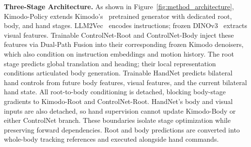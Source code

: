
\textbf{Three-Stage Architecture.}
As shown in Figure~\ref{fig:method_architecture}, Kimodo-Policy extends Kimodo's~\cite{kimodo} pretrained generator with dedicated root, body, and hand stages. LLM2Vec~\cite{behnamghader2024llm2veclargelanguagemodels} encodes instructions; frozen DINOv3~\cite{dinov3} extracts visual features. Trainable ControlNet-Root and ControlNet-Body inject these features via Dual-Path Fusion into their corresponding frozen Kimodo denoisers, which also condition on instruction embeddings and motion history. The root stage predicts global translation and heading; their local representation conditions articulated body generation. Trainable HandNet predicts bilateral hand controls from future body features, visual features, and the current bilateral hand state. All root-to-body conditioning is detached, blocking body-stage gradients to Kimodo-Root and ControlNet-Root. HandNet's body and visual inputs are also detached, so hand supervision cannot update Kimodo-Body or either ControlNet branch. These boundaries isolate stage optimization while preserving forward dependencies. Root and body predictions are converted into whole-body tracking references and executed alongside hand commands.

